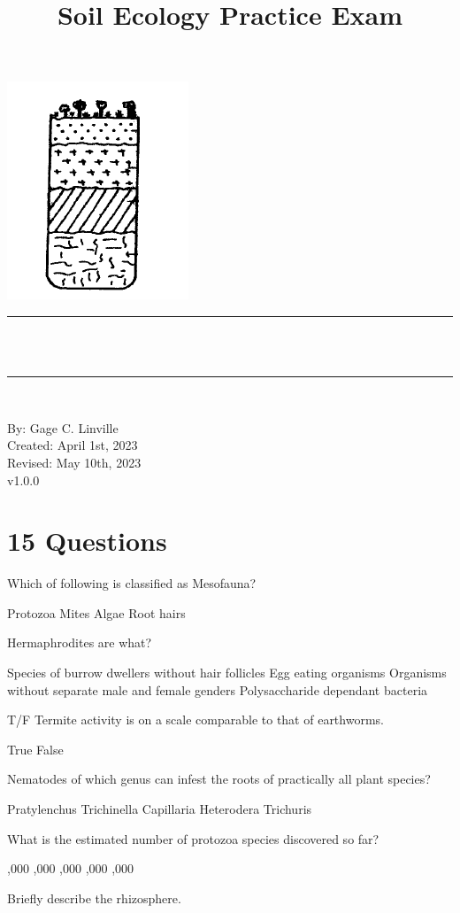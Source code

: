 \documentclass[12pt]{exam}
\title{Soil Ecology Practice Exam}			        %
\author{\studentone}				                %
\makeatletter
\newcommand{\semanticversion}{v1.0.0}                           %
\newcommand{\studentone}{Gage C. Linville}			%
\newcommand{\studentwebsite}{soils.land}                        %
\newcommand{\creationdate}{April 1st, 2023}
\newcommand{\revisiondate}{May 10th, 2023}
\def\maketitle{%
  \null
  \thispagestyle{empty}
  \begin{center}\leavevmode
       \normalfont
       \includegraphics[width=0.20\columnwidth]{figures/Image_Edit.png}
	\rule{\linewidth}{0.2 mm} \\[0.4 cm]
	{ \huge \bfseries \@title}\\
	\rule{\linewidth}{0.2 mm} \\[0.4 cm]

	\begin{minipage}{0.5\textwidth}
		\begin{center} \large
			By: \studentone\\
            Created: \creationdate\\
            Revised: \revisiondate\\
            \semanticversion\\
			\end{center}
			\end{minipage}
   \end{center}
   \vfill
   \null
   \cleardoublepage
  }
\makeatother
\begin{document}
\maketitle
\let\cleardoublepage\clearpage
\sloppy


\section*{15 Questions}
\begin{questions}
\question Which of following is classified as Mesofauna?

\begin{oneparchoices}
 \choice Protozoa
 \choice Mites %
 \choice Algae
 \choice Root hairs
\end{oneparchoices}

\question Hermaphrodites are what?

\begin{choices}
 \choice Species of burrow dwellers without hair follicles
 \choice Egg eating organisms
 \choice Organisms without separate male and female genders %
 \choice Polysaccharide dependant bacteria
\end{choices}

\question T/F Termite activity is on a scale comparable to that of earthworms.

\begin{oneparchoices}
 \choice True %
 \choice False
\end{oneparchoices}

\question Nematodes of which genus can infest the roots of practically all plant species?

\begin{oneparchoices}
 \choice Pratylenchus
 \choice Trichinella
 \choice Capillaria
 \choice Heterodera %
 \choice Trichuris
\end{oneparchoices}

\question What is the estimated number of protozoa species discovered so far?

\begin{oneparchoices}
 ,000
 ,000
 ,000 %
 ,000
 ,000
\end{oneparchoices}

\question Briefly describe the rhizosphere.
\vspace{0.8in}


\end{questions}
\end{document}
